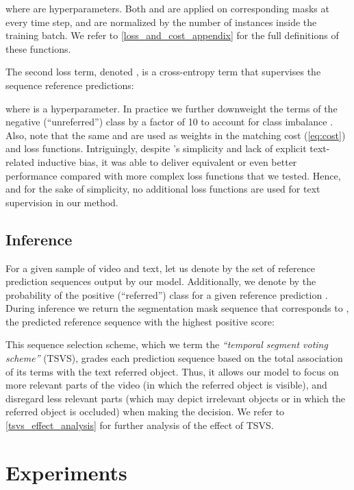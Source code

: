 \documentclass[10pt,twocolumn,letterpaper]{article}
\renewcommand{\cite}[1]{\citep{#1}}
\begin{document}
where  are hyperparameters. Both  and  are applied on corresponding masks at every time step, and are normalized by the number of instances inside the training batch. We refer to \cref{loss_and_cost_appendix} for the full definitions of these functions.

The second loss term, denoted , is a cross-entropy term that supervises the sequence reference predictions:
 
where  is a hyperparameter. In practice we further downweight the terms of the negative (``unreferred'') class by a factor of 10 to account for class imbalance \cite{carion2020detr}. Also, note that the same  and  are used as weights in the matching cost (\ref{eq:cost}) and loss functions.
Intriguingly, despite 's simplicity and lack of explicit text-related inductive bias, it was able to deliver equivalent or even better performance compared with more complex loss functions \cite{kamath2021mdetr} that we tested. Hence, and for the sake of simplicity, no additional loss functions are used for text supervision in our method.

 \subsection{Inference} \label{subsec:inference}
For a given sample of video and text, let us denote by  the set of reference prediction sequences output by our model. Additionally, we denote by  the probability of the positive (``referred'') class for a given reference prediction . During inference we return the segmentation mask sequence  that corresponds to , the predicted reference sequence with the highest positive score:
 
This sequence selection scheme, which we term the \textit{``temporal segment voting scheme''} (TSVS), grades each prediction sequence based on the total association of its terms with the text referred object. Thus, it allows our model to focus on more relevant parts of the video (in which the referred object is visible), and disregard less relevant parts (which may depict irrelevant objects or in which the referred object is occluded) when making the decision. We refer to \cref{tsvs_effect_analysis} for further analysis of the effect of TSVS.
 \section{Experiments}
\label{sec:experiment}
\end{document}
